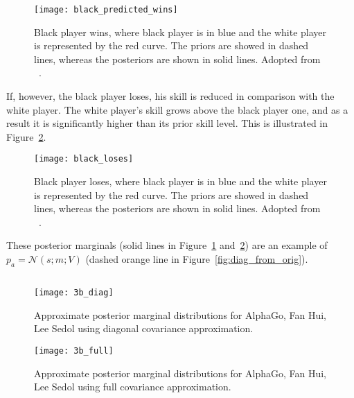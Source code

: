\documentclass[a4paper,11pt]{article}
\theoremstyle{mytheor}
\begin{document}
\begin{figure}[htpb!]
    \centering
    \texttt{[image: black\_predicted\_wins]}
    \caption{Black player wins, where black player is in blue and the white player is represented by the red curve. The priors are showed in dashed lines, whereas the posteriors are shown in solid lines. Adopted from ~\cite{bishop2013model}.}
    \label{fig:black_predicted_wins}
\end{figure}

If, however, the black player loses, his skill is reduced in comparison with the white player. The white player's skill grows above the black player one, and as a result it is significantly higher than its prior skill level. This is illustrated in Figure~\ref{fig:black_loses}.

\begin{figure}[htpb!]
    \centering
    \texttt{[image: black\_loses]}
    \caption{Black player loses, where black player is in blue and the white player is represented by the red curve. The priors are showed in dashed lines, whereas the posteriors are shown in solid lines. Adopted from ~\cite{bishop2013model}.}
    \label{fig:black_loses}
\end{figure}

These posterior marginals (solid lines in Figure~\ref{fig:black_predicted_wins} and~\ref{fig:black_loses}) are an example of $p_a=\mathcal{N}(s;m;V)$ (dashed orange line in Figure~\ref{fig:diag_from_orig}).


\subsection{}
\label{sec:3c}

\begin{figure}[htpb!]
    \centering
    \texttt{[image: 3b\_diag]}
    \caption{Approximate posterior marginal distributions for AlphaGo, Fan Hui, Lee Sedol using diagonal covariance approximation.}
    \label{fig:3b_diag}
\end{figure}

\begin{figure}[htpb!]
    \centering
    \texttt{[image: 3b\_full]}
    \caption{Approximate posterior marginal distributions for AlphaGo, Fan Hui, Lee Sedol using full covariance approximation.}
    \label{fig:3b_full}
\end{figure}
\end{document}
